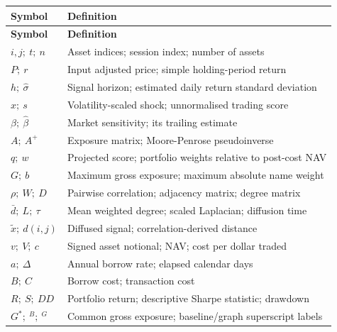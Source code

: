 \documentclass[12pt,a4paper,oneside]{article}
\begin{document}
\begingroup
\setcounter{table}{1}
\fontsize{10}{12.5}\selectfont
\renewcommand{\arraystretch}{1.12}
\setlength{\aboverulesep}{1pt}\setlength{\belowrulesep}{1pt}
\begin{longtable}{P{0.290000\dimexpr{}\tabcolsep\relax}P{0.710000\dimexpr{}\tabcolsep\relax}}
\toprule
{} \textbf{Symbol} & \textbf{Definition} \\ \midrule
\endfirsthead
\toprule
{} \textbf{Symbol} & \textbf{Definition} \\ \midrule
\endhead
\endfoot
\endlastfoot
\(i,j;\ t;\ n\) & Asset indices; session index; number of assets \\
\midrule[0.2pt]
\(P;\ r\) & Input adjusted price; simple holding-period return \\
\midrule[0.2pt]
\(h;\ \widehat\sigma\) & Signal horizon; estimated daily return standard deviation \\
\midrule[0.2pt]
\(x;\ s\) & Volatility-scaled shock; unnormalised trading score \\
\midrule[0.2pt]
\(\beta;\ \widehat\beta\) & Market sensitivity; its trailing estimate \\
\midrule[0.2pt]
\(A;\ A^{+}\) & Exposure matrix; Moore-Penrose pseudoinverse \\
\midrule[0.2pt]
\(q;\ w\) & Projected score; portfolio weights relative to post-cost NAV \\
\midrule[0.2pt]
\(G;\ b\) & Maximum gross exposure; maximum absolute name weight \\
\midrule[0.2pt]
\(\rho;\ W;\ D\) & Pairwise correlation; adjacency matrix; degree matrix \\
\midrule[0.2pt]
\(\bar d;\ L;\ \tau\) & Mean weighted degree; scaled Laplacian; diffusion time \\
\midrule[0.2pt]
\(\widetilde x;\ d(i,j)\) & Diffused signal; correlation-derived distance \\
\midrule[0.2pt]
\(v;\ V;\ c\) & Signed asset notional; NAV; cost per dollar traded \\
\midrule[0.2pt]
\(a;\ \Delta\) & Annual borrow rate; elapsed calendar days \\
\midrule[0.2pt]
\(B;\ C\) & Borrow cost; transaction cost \\
\midrule[0.2pt]
\(R;\ S;\ DD\) & Portfolio return; descriptive Sharpe statistic; drawdown \\
\midrule[0.2pt]
\(G^{*};\ {}^{B};\ {}^{G}\) & Common gross exposure; baseline/graph superscript labels \\

\end{longtable}
\end{document}
